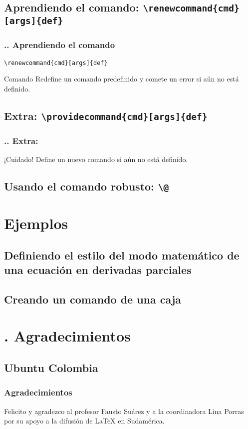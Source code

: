\documentclass[12pt]{beamer}
\begin{document}
\cprotect\subsection{Aprendiendo el comando: \verb!\renewcommand{cmd}[args]{def}!}

\begin{frame}[fragile]
\frametitle{\thesection.\thesubsection. Aprendiendo el comando }
\vspace*{-2cm}
\centering
\verb|\renewcommand{cmd}[args]{def}|

\begin{block}{Comando }
Redefine un comando predefinido y comete un error si aún no está definido.
\end{block}
\end{frame}

\cprotect\subsection{Extra: \verb!\providecommand{cmd}[args]{def}!}

\begin{frame}
\frametitle{\thesection.\thesubsection. Extra: }

\begin{alertblock}{¡Cuidado!}
Define un nuevo comando si aún no está definido.
\end{alertblock}
\end{frame}

\cprotect\subsection{Usando el comando robusto: \verb!\@!}

\section{Ejemplos}

\subsection{Definiendo el estilo del modo matemático de una ecuación en derivadas parciales}
\subsection{Creando un comando de una caja}

\section{\thesection. Agradecimientos}
\subsection{Ubuntu Colombia}
\begin{frame}
\frametitle{Agradecimientos}
\Large
Felicito y agradezco al profesor Fausto Suárez y a la coordinadora Lina Porras por su apoyo a la difusión de \LaTeX{} en Sudamérica.
\end{frame}
\end{document}
